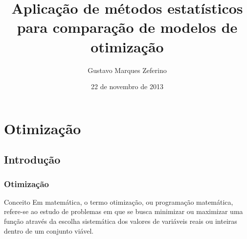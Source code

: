 \documentclass[xcolor=dvipsnames]{beamer}
\title{Aplicação de métodos estatísticos para comparação de modelos de otimização}
\author
{
	Gustavo Marques Zeferino \\
}
\institute{SACSIS 2013}
\date{22 de novembro de 2013}
\begin{document}


\frame{\titlepage} %





\section{Otimização}

\subsection{Introdução}

\begin{frame}%
\frametitle{Otimização}

\begin{block}{Conceito}
Em matemática, o termo otimização, ou programação matemática, refere-se ao estudo de problemas em que se busca minimizar ou maximizar uma função através da escolha sistemática dos valores de variáveis reais ou inteiras dentro de um conjunto viável.
\end{block}

\end{frame}%
\end{document}
